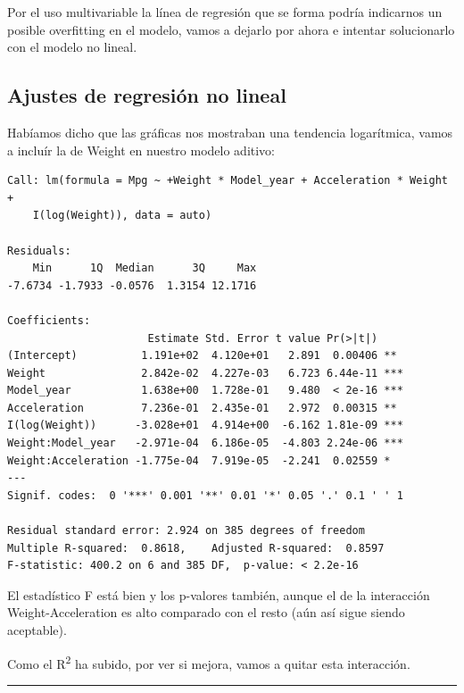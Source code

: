 Por el uso multivariable la línea de regresión que se forma podría indicarnos un posible overfitting en el modelo, vamos a dejarlo por ahora e intentar solucionarlo con el modelo no lineal.

\subsection{Ajustes de regresión no lineal}

Habíamos dicho que las gráficas nos mostraban una tendencia logarítmica, vamos a incluír la de Weight en nuestro modelo aditivo:
\begin{verbatim}
Call: lm(formula = Mpg ~ +Weight * Model_year + Acceleration * Weight + 
    I(log(Weight)), data = auto)

Residuals:
    Min      1Q  Median      3Q     Max 
-7.6734 -1.7933 -0.0576  1.3154 12.1716 

Coefficients:
                      Estimate Std. Error t value Pr(>|t|)    
(Intercept)          1.191e+02  4.120e+01   2.891  0.00406 ** 
Weight               2.842e-02  4.227e-03   6.723 6.44e-11 ***
Model_year           1.638e+00  1.728e-01   9.480  < 2e-16 ***
Acceleration         7.236e-01  2.435e-01   2.972  0.00315 ** 
I(log(Weight))      -3.028e+01  4.914e+00  -6.162 1.81e-09 ***
Weight:Model_year   -2.971e-04  6.186e-05  -4.803 2.24e-06 ***
Weight:Acceleration -1.775e-04  7.919e-05  -2.241  0.02559 *  
---
Signif. codes:  0 '***' 0.001 '**' 0.01 '*' 0.05 '.' 0.1 ' ' 1

Residual standard error: 2.924 on 385 degrees of freedom
Multiple R-squared:  0.8618,    Adjusted R-squared:  0.8597 
F-statistic: 400.2 on 6 and 385 DF,  p-value: < 2.2e-16
\end{verbatim}

El estadístico F está bien y los p-valores también, aunque el de la interacción Weight-Acceleration es alto comparado con el resto (aún así sigue siendo aceptable).

Como el R\textsuperscript{2} ha subido, por ver si mejora, vamos a quitar esta interacción.

\begin{center}\rule{\linewidth}{0.5pt}\end{center}

